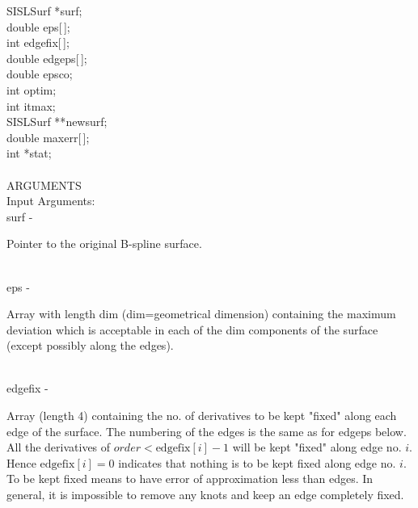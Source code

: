                \>\>    SISLSurf        \>      *{\fov surf};\\
                \>\>    double  \>      {\fov eps}[\,];\\
                \>\>    int     \>      {\fov edgefix}[\,];\\
                \>\>    double  \>      {\fov edgeps}[\,];\\
                \>\>    double  \>      {\fov epsco};\\
                \>\>    int     \>      {\fov optim};\\
                \>\>    int     \>      {\fov itmax};\\
                \>\>    SISLSurf        \>      **{\fov newsurf};\\
                \>\>    double  \>      {\fov maxerr}[\,];\\
                \>\>    int     \>      *{\fov stat};\\
\\
ARGUMENTS\\
        \>Input Arguments:\\
        \>\>    {\fov surf}\> - \>      \begin{minipg2}
                                Pointer to the original B-spline surface.
                                \end{minipg2}\\
        \>\>    {\fov eps}\> - \>       \begin{minipg2}
                                Array with length dim (dim=geometrical dimension)
                                containing the
                                maximum deviation which is
                                acceptable in each of the dim
                                components of the surface (except
                                possibly along the edges).
                                \end{minipg2}\\[0.3ex]
        \>\>    {\fov edgefix}\> - \>   \begin{minipg2}
                                Array (length 4) containing the no. of derivatives to be
                                kept "fixed" along each edge of the surface. The
                                numbering of the edges is the same as for edgeps
                                below. All the derivatives of
                                $order<\mbox{edgefix}[i]-1$ will
                                be kept "fixed" along edge no. $i$.
                                Hence $\mbox{edgefix}[i]=0$
                                indicates that nothing is to be kept fixed along edge
                                no. $i$. To be kept fixed means to have error of approximation less
                                than edges. In general, it is impossible to remove any
                                knots and keep an edge completely fixed.
                                \end{minipg2}\\
